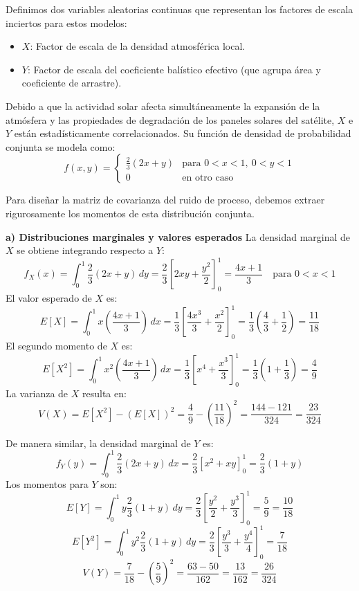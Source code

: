 Definimos dos variables aleatorias continuas que representan los factores de escala inciertos para estos modelos:
\begin{itemize}
    \item $X$: Factor de escala de la densidad atmosférica local.
    \item $Y$: Factor de escala del coeficiente balístico efectivo (que agrupa área y coeficiente de arrastre).
\end{itemize}

Debido a que la actividad solar afecta simultáneamente la expansión de la atmósfera y las propiedades de degradación de los paneles solares del satélite, $X$ e $Y$ están estadísticamente correlacionados. Su función de densidad de probabilidad conjunta se modela como:
$$
f(x,y) = 
\begin{cases} 
\frac{2}{3}(2x + y) & \text{para } 0 < x < 1, \ 0 < y < 1 \\
0 & \text{en otro caso}
\end{cases}
$$

Para diseñar la matriz de covarianza del ruido de proceso, debemos extraer rigurosamente los momentos de esta distribución conjunta.

\textbf{a) Distribuciones marginales y valores esperados}
La densidad marginal de $X$ se obtiene integrando respecto a $Y$:
$$ f_X(x) = \int_{0}^{1} \frac{2}{3}(2x + y) \, dy = \frac{2}{3} \left[ 2xy + \frac{y^2}{2} \right]_{0}^{1} = \frac{4x + 1}{3} \quad \text{para } 0 < x < 1 $$
El valor esperado de $X$ es:
$$ E[X] = \int_{0}^{1} x \left( \frac{4x + 1}{3} \right) \, dx = \frac{1}{3} \left[ \frac{4x^3}{3} + \frac{x^2}{2} \right]_{0}^{1} = \frac{1}{3} \left( \frac{4}{3} + \frac{1}{2} \right) = \frac{11}{18} $$
El segundo momento de $X$ es:
$$ E[X^2] = \int_{0}^{1} x^2 \left( \frac{4x + 1}{3} \right) \, dx = \frac{1}{3} \left[ x^4 + \frac{x^3}{3} \right]_{0}^{1} = \frac{1}{3} \left( 1 + \frac{1}{3} \right) = \frac{4}{9} $$
La varianza de $X$ resulta en:
$$ V(X) = E[X^2] - (E[X])^2 = \frac{4}{9} - \left(\frac{11}{18}\right)^2 = \frac{144 - 121}{324} = \frac{23}{324} $$

De manera similar, la densidad marginal de $Y$ es:
$$ f_Y(y) = \int_{0}^{1} \frac{2}{3}(2x + y) \, dx = \frac{2}{3} \left[ x^2 + xy \right]_{0}^{1} = \frac{2}{3}(1 + y) $$
Los momentos para $Y$ son:
$$ E[Y] = \int_{0}^{1} y \frac{2}{3}(1 + y) \, dy = \frac{2}{3} \left[ \frac{y^2}{2} + \frac{y^3}{3} \right]_{0}^{1} = \frac{5}{9} = \frac{10}{18} $$
$$ E[Y^2] = \int_{0}^{1} y^2 \frac{2}{3}(1 + y) \, dy = \frac{2}{3} \left[ \frac{y^3}{3} + \frac{y^4}{4} \right]_{0}^{1} = \frac{7}{18} $$
$$ V(Y) = \frac{7}{18} - \left(\frac{5}{9}\right)^2 = \frac{63 - 50}{162} = \frac{13}{162} = \frac{26}{324} $$

